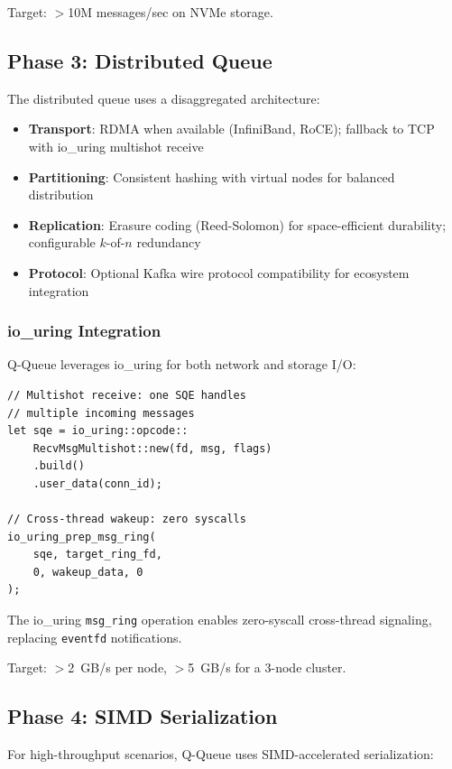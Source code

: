 \documentclass[11pt,a4paper,twocolumn]{article}
\begin{document}
Target: $>$10M messages/sec on NVMe storage.

\subsection{Phase 3: Distributed Queue}

The distributed queue uses a disaggregated architecture:

\begin{itemize}[nosep]
\item \textbf{Transport}: RDMA when available (InfiniBand, RoCE); fallback to TCP with io\_uring multishot receive
\item \textbf{Partitioning}: Consistent hashing with virtual nodes for balanced distribution
\item \textbf{Replication}: Erasure coding (Reed-Solomon) for space-efficient durability; configurable $k$-of-$n$ redundancy
\item \textbf{Protocol}: Optional Kafka wire protocol compatibility for ecosystem integration
\end{itemize}

\subsubsection{io\_uring Integration}

Q-Queue leverages io\_uring for both network and storage I/O:

\begin{lstlisting}
// Multishot receive: one SQE handles
// multiple incoming messages
let sqe = io_uring::opcode::
    RecvMsgMultishot::new(fd, msg, flags)
    .build()
    .user_data(conn_id);

// Cross-thread wakeup: zero syscalls
io_uring_prep_msg_ring(
    sqe, target_ring_fd,
    0, wakeup_data, 0
);
\end{lstlisting}

The io\_uring \texttt{msg\_ring} operation enables zero-syscall cross-thread signaling, replacing \texttt{eventfd} notifications.

Target: $>$2~GB/s per node, $>$5~GB/s for a 3-node cluster.

\subsection{Phase 4: SIMD Serialization}

For high-throughput scenarios, Q-Queue uses SIMD-accelerated serialization:
\end{document}
